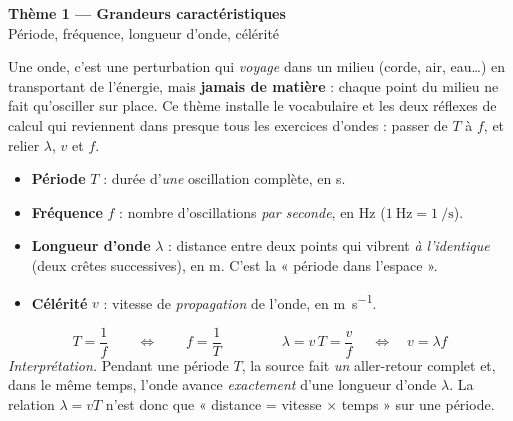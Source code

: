 \documentclass[11pt,a4paper]{article}
\begin{document}

\begin{center}
{\LARGE\bfseries\color{primarydark} Thème 1 — Grandeurs caractéristiques}\\[2pt]
{\large\color{primary} Période, fréquence, longueur d'onde, célérité}
\end{center}

\medskip
Une onde, c'est une perturbation qui \emph{voyage} dans un milieu (corde, air, eau\ldots)
en transportant de l'énergie, mais \textbf{jamais de matière} : chaque point du milieu ne
fait qu'osciller sur place. Ce thème installe le vocabulaire et les deux réflexes de calcul
qui reviennent dans presque tous les exercices d'ondes : passer de $T$ à $f$, et relier
$\lambda$, $v$ et $f$.

\begin{cle}
\begin{itemize}[leftmargin=1.4em,topsep=2pt,itemsep=2pt]
  \item \textbf{Période} $T$ : durée d'\emph{une} oscillation complète, en \si{\second}.
  \item \textbf{Fréquence} $f$ : nombre d'oscillations \emph{par seconde}, en \si{\hertz}
        ($\SI{1}{\hertz}=\SI{1}{\per\second}$).
  \item \textbf{Longueur d'onde} $\lambda$ : distance entre deux points qui vibrent
        \emph{à l'identique} (deux crêtes successives), en \si{\metre}. C'est la
        « période dans l'espace ».
  \item \textbf{Célérité} $v$ : vitesse de \emph{propagation} de l'onde, en \si{\metre\per\second}.
\end{itemize}
\end{cle}

\begin{cle}
\[ T=\frac{1}{f}\qquad\Longleftrightarrow\qquad f=\frac{1}{T}
   \qquad\qquad
   \boxed{\;\lambda = v\,T = \frac{v}{f}\;}\quad\Longleftrightarrow\quad v=\lambda f \]
\emph{Interprétation.} Pendant une période $T$, la source fait \emph{un} aller-retour complet
et, dans le même temps, l'onde avance \emph{exactement} d'une longueur d'onde $\lambda$.
La relation $\lambda=vT$ n'est donc que « distance = vitesse $\times$ temps » sur une période.
\end{cle}
\end{document}
